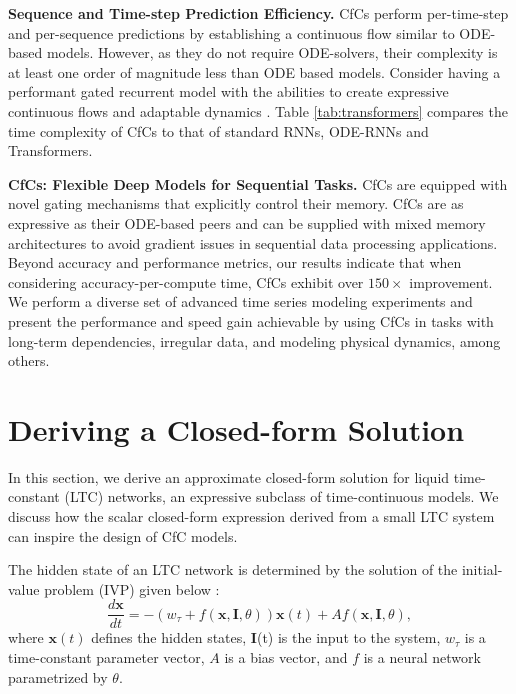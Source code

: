 \documentclass[12pt]{article}
\begin{document}
\noindent \textbf{Sequence and Time-step Prediction Efficiency.} CfCs perform per-time-step and per-sequence predictions by establishing a continuous flow similar to ODE-based models. However, as they do not require ODE-solvers, their complexity is at least one order of magnitude less than ODE based models. Consider  having a performant gated recurrent model \cite{hochreiter1997long} with the abilities to create expressive continuous flows \cite{chen2018neural} and adaptable dynamics \cite{hasani2021liquid}. Table \ref{tab:transformers} compares the time complexity of CfCs to that of standard RNNs, ODE-RNNs and Transformers. 

\noindent \textbf{CfCs: Flexible Deep Models for Sequential Tasks.} CfCs are equipped with novel gating mechanisms that explicitly control their memory. CfCs are as expressive as their ODE-based peers and can be supplied with mixed memory architectures \cite{lechner2020learning} to avoid gradient issues in sequential data processing applications. Beyond accuracy and performance metrics, our results indicate that when considering accuracy-per-compute time, CfCs exhibit over $150\times$ improvement. We perform a diverse set of advanced time series modeling experiments and present the performance and speed gain achievable by using CfCs in tasks with long-term dependencies, irregular data, and modeling physical dynamics, among others. 

\section*{Deriving a Closed-form Solution}
\label{sec:deriving}

In this section, we derive an approximate closed-form solution for liquid time-constant (LTC) networks, an expressive subclass of time-continuous models. We discuss how the scalar closed-form expression derived from a small LTC system can inspire the design of CfC models.

The hidden state of an LTC network is determined by the solution of the initial-value problem (IVP) given below \cite{hasani2021liquid}:
\begin{equation}
\label{eq:ltc}
    \frac{d\textbf{x}}{dt} = - (w_\tau + f(\textbf{x},\textbf{I},\theta)) \textbf{x}(t) + A f(\textbf{x},\textbf{I},\theta),
\end{equation}
where $\textbf{x}(t)$ defines the hidden states, \textbf{I}(t) is the input to the system, $w_\tau$ is a time-constant parameter vector, $A$ is a bias vector, and $f$ is a neural network parametrized by $\theta$.
\end{document}
